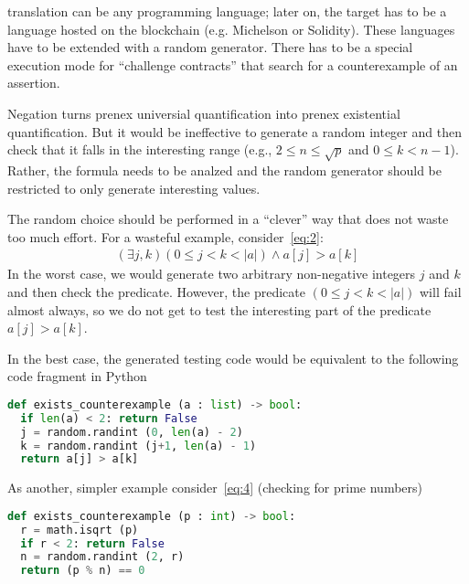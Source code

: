 \documentclass{article}
\begin{document}
\begin{itemize}
\begin{enumerate}
    translation can be any programming 
    language; later on, the target has to be a language hosted on the blockchain
    (e.g. Michelson or Solidity). These languages have to be extended with a random
    generator. There has to be a special execution mode for ``challenge contracts''
    that search for a counterexample of an assertion.
  \end{enumerate}
  Negation turns prenex universial quantification into prenex existential quantification. But it
  would be ineffective to generate a random integer and then check that it falls in the
  interesting range (e.g., $2\le n \le \sqrt p$ and $0\le k< n-1$). Rather, the formula
  needs to be analzed and the random generator should be restricted to only generate
  interesting values. 

  The random choice should be performed in a ``clever'' way that does not waste too
  much effort. For a wasteful example, consider~\eqref{eq:2}:
  \begin{gather*}
    (\exists j, k ) (0\le j< k < |a|) \wedge a[j] > a[k]
  \end{gather*}
  In the worst case, we would generate two arbitrary non-negative integers $j$ and $k$
  and then check the predicate. However, the predicate $(0\le j< k < |a|)$ will fail
  almost always, so we do not get to test the interesting part of the predicate
  $a[j]>a[k]$.

  In the best case, the generated testing code would be equivalent to the following code fragment
  in Python
\begin{lstlisting}[language=Python]
def exists_counterexample (a : list) -> bool:
  if len(a) < 2: return False
  j = random.randint (0, len(a) - 2)
  k = random.randint (j+1, len(a) - 1)
  return a[j] > a[k]
\end{lstlisting}

  As another, simpler example consider~\eqref{eq:4} (checking for prime numbers)
\begin{lstlisting}[language=Python]
def exists_counterexample (p : int) -> bool:
  r = math.isqrt (p)
  if r < 2: return False
  n = random.randint (2, r)
  return (p % n) == 0
\end{lstlisting}


\end{itemize}
\end{document}
